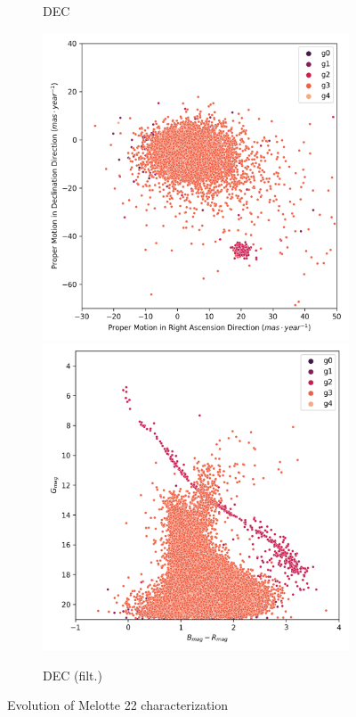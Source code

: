 \documentclass[11pt,a4paper,english,twocolumn]{article}
\begin{document}
\begin{figure}[!htbp]
\begin{subfigure}[b]{0.3\textwidth}
      \caption{DEC}
  \end{subfigure}
  \medskip
  \begin{subfigure}[b]{0.3\textwidth}
    \centering
      \includegraphics[width=\textwidth]{../figures/melotte_22/dec_pm_filtered_melotte_22.png}
      \includegraphics[width=\textwidth]{../figures/melotte_22/dec_hr_diagram_filtered_melotte_22.png}
      \caption{DEC (filt.)}
  \end{subfigure}
  \caption{Evolution of Melotte 22 characterization}
  \label{fig:melotte_22_characterization_evolution}
\end{figure}
\end{document}
